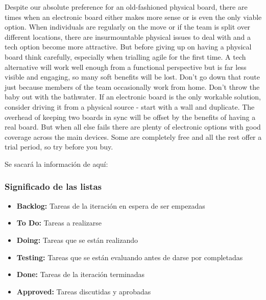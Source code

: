 Despite our absolute preference for an old-fashioned physical
board, there are times when an electronic board either makes
more sense or is even the only viable option. When individuals
are regularly on the move or if the team is split over different
locations, there are insurmountable physical issues to deal with
and a tech option become more attractive.
But before giving up on having a physical board think carefully,
especially when trialling agile for the first time. A tech alternative
will work well enough from a functional perspective but is far
less visible and engaging, so many soft benefits will be lost.
Don't go down that route just because members of the team
occasionally work from home. Don't throw the baby out with
the bathwater.
If an electronic board is the only workable solution, consider
driving it from a physical source - start with a wall and duplicate.
The overhead of keeping two boards in sync will be offset by the
benefits of having a real board. But when all else fails there are
plenty of electronic options with good coverage across the main
devices. Some are completely free and all the rest offer a trial
period, so try before you buy.


Se sacará la información de aquí: \cite{Brechner2015-dv} %
\subsubsection{Significado de las listas}

\begin{itemize}
    \item \textbf{Backlog:} Tareas de la iteración en espera de ser empezadas
    \item \textbf{To Do:} Tareas a realizarse
    \item \textbf{Doing:} Tareas que se están realizando
    \item \textbf{Testing:} Tareas que se están evaluando antes de darse por completadas
    \item \textbf{Done:} Tareas de la iteración terminadas
    \item \textbf{Approved:} Tareas discutidas y aprobadas
\end{itemize}

